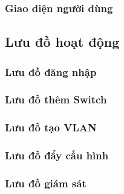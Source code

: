 \subsubsection{Giao diện người dùng}

\subsection{Lưu đồ hoạt động}

\subsubsection{Lưu đồ đăng nhập}

\subsubsection{Lưu đồ thêm Switch}

\subsubsection{Lưu đồ tạo VLAN}

\subsubsection{Lưu đồ đẩy cấu hình}

\subsubsection{Lưu đồ giám sát}
